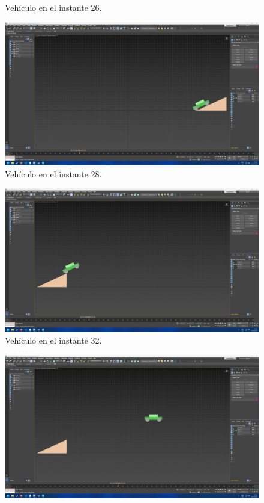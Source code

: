 \documentclass{article}
\begin{document}
{\begin{figure}[H]
    \caption{Vehículo en el instante 26.}
 \end{figure}
 \begin{figure}[H]
    \centering
    \includegraphics[width=\textwidth]{imagenes/Ejercicio2/keyframes/28.png}
    \caption{Vehículo en el instante 28.}
 \end{figure}
 \begin{figure}[H]
    \centering
    \includegraphics[width=\textwidth]{imagenes/Ejercicio2/keyframes/32.png}
    \caption{Vehículo en el instante 32.}
 \end{figure}
 \begin{figure}[H]
    \centering
    \includegraphics[width=\textwidth]{imagenes/Ejercicio2/keyframes/44.png}

\end{figure}}
\end{document}
